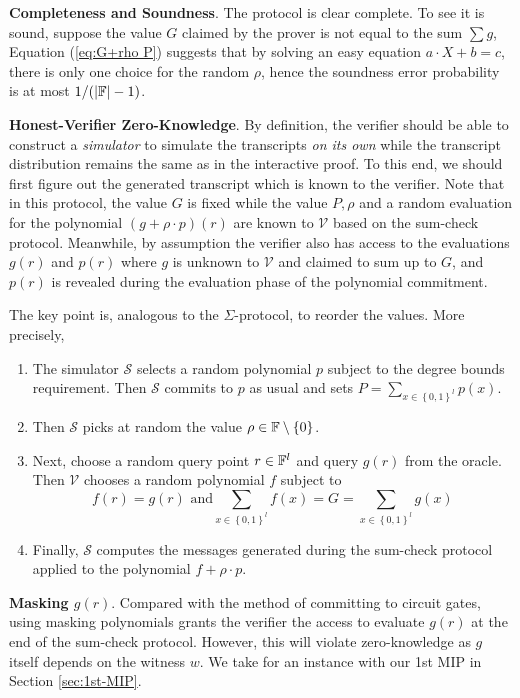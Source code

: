 \documentclass{article}
\begin{document}
\textbf{Completeness and Soundness}. The protocol is clear complete. To see it is sound, suppose the value $G$ claimed by the prover is not equal to the sum $\sum g$, Equation (\ref{eq:G+rho P}) suggests that by solving an easy equation $a \cdot X + b = c$, there is only one choice for the random $\rho$, hence the soundness error probability is at most $1 / (\abs{\mathbb{F}} - 1)$.

\textbf{Honest-Verifier Zero-Knowledge}. By definition, the verifier should be able to construct a \textit{simulator} to simulate the transcripts \textit{on its own} while the transcript distribution remains the same as in the interactive proof. To this end, we should first figure out the generated transcript which is known to the verifier. Note that in this protocol, the value $G$ is fixed while the value $P, \rho$ and a random evaluation for the polynomial $(g + \rho \cdot p)(r)$ are known to $\mathcal{V}$ based on the sum-check protocol. Meanwhile, by assumption the verifier also has access to the evaluations $g(r)$ and $p(r)$ where $g$ is unknown to $\mathcal{V}$ and claimed to sum up to $G$, and $p(r)$ is revealed during the evaluation phase of the polynomial commitment.

The key point is, analogous to the $\Sigma$-protocol, to reorder the values. More precisely, 
\begin{enumerate}
\item\label{item:74} The simulator $\mathcal{S}$ selects a random polynomial $p$ subject to the degree bounds requirement. Then $\mathcal{S}$ commits to $p$ as usual and sets $P = \sum_{x \in \left\{ 0, 1 \right\}^l} p(x)$. 
\item\label{item:75} Then $\mathcal{S}$ picks at random the value $\rho \in \mathbb{F} \setminus \left\{ 0 \right\}$. 
\item\label{item:76} Next, choose a random query point $r \in \mathbb{F}^l$ and query $g(r)$ from the oracle. Then $\mathcal{V}$ chooses a random polynomial $f$ subject to 
\begin{equation*}
f(r) = g(r) \text{ and} \sum_{x \in \left\{ 0, 1 \right\}^l} f(x) = G = \sum_{x \in \left\{ 0, 1 \right\}^l} g(x)
\end{equation*}
\item\label{item:77} Finally, $\mathcal{S}$ computes the messages generated during the sum-check protocol applied to the polynomial $f + \rho \cdot p$. 
\end{enumerate}

\textbf{Masking $g(r)$}. Compared with the method of committing to circuit gates, using masking polynomials grants the verifier the access to evaluate $g(r)$ at the end of the sum-check protocol. However, this will violate zero-knowledge as $g$ itself depends on the witness $w$. We take for an instance with our 1st MIP in Section  \ref{sec:1st-MIP}.
\end{document}
